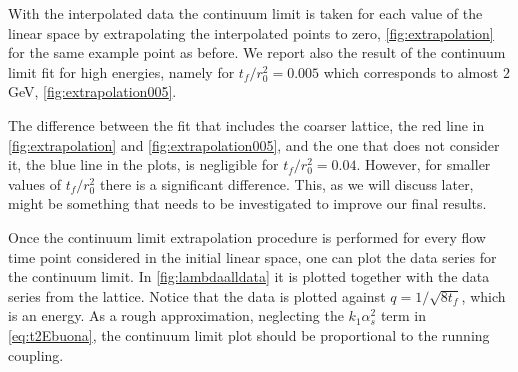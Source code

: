 With the interpolated data the continuum limit is taken for each value of the linear space by extrapolating the interpolated points to zero, \cref{fig:extrapolation} for the same example point as before. We report also the result of the continuum limit fit for high energies, namely for $t_f/r_0^2=0.005$ which corresponds to almost $2$ GeV, \cref{fig:extrapolation005}. \\

The difference between the fit that includes the coarser lattice, the red line in \cref{fig:extrapolation} and \cref{fig:extrapolation005}, and the one that does not consider it, the blue line in the plots, is negligible for $t_f/r_0^2=0.04$. However, for smaller values of $t_f/r_0^2$ there is a significant difference. This, as we will discuss later, might be something that needs to be investigated to improve our final results.

Once the continuum limit extrapolation procedure is performed for every flow time point considered in the initial linear space, one can plot the data series for the continuum limit. In \cref{fig:lambdaalldata} it is plotted together with the data series from the lattice. Notice that the data is plotted against $q=1 / \sqrt{8t_f}$, which is an energy. As a rough approximation, neglecting the $k_1\alpha_s^2$ term in \cref{eq:t2Ebuona}, the continuum limit plot should be proportional to the running coupling.


